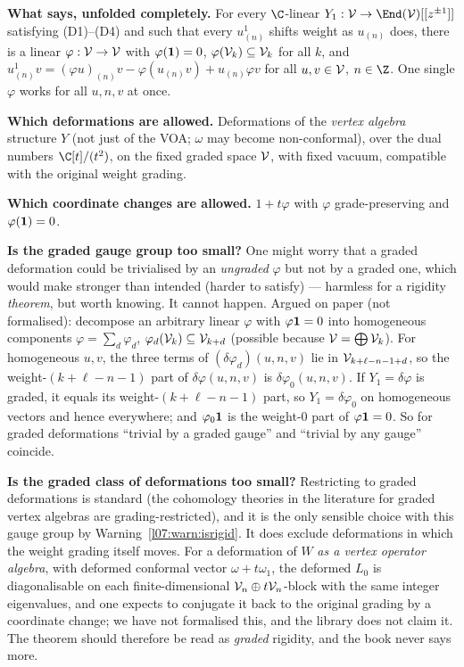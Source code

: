 \begin{dictionary}
\textbf{What  says, unfolded completely.} For every $\C$-linear
$Y_1:\lsevenV\to\End(\lsevenV)[[z^{\pm1}]]$ satisfying (D1)--(D4) and such that every $u^1_{(n)}$ shifts
weight as $u_{(n)}$ does, there is a linear $\varphi:\mathcal{V}\to\mathcal{V}$ with $\varphi(\mathbf{1}) = 0$,
$\varphi(\mathcal{V}_k)\subseteq\mathcal{V}_k$ for all $k$, and
$u^1_{(n)}v = (\varphi u)_{(n)}v - \varphi(u_{(n)}v) + u_{(n)}\varphi v$ for all $u,v\in\mathcal{V}$,
$n\in\Z$. One single $\varphi$ works for all $u,n,v$ at once.

\textbf{Which deformations are allowed.} Deformations of the \emph{vertex algebra} structure $Y$
(not just of the VOA; $\omega$ may become non-conformal), over the dual numbers $\C[t]/(t^2)$, on the
fixed graded space $\mathcal{V}$, with fixed vacuum, compatible with the original weight grading.

\textbf{Which coordinate changes are allowed.} $1+t\varphi$ with $\varphi$ grade-preserving and
$\varphi(\mathbf{1}) = 0$.

\textbf{Is the graded gauge group too small?} One might worry that a graded deformation could be
trivialised by an \emph{ungraded} $\varphi$ but not by a graded one, which would make
 stronger than intended (harder to satisfy) --- harmless for a rigidity
\emph{theorem}, but worth knowing. It cannot happen. Argued on paper (not formalised): decompose an
arbitrary linear $\varphi$ with $\varphi\mathbf{1} = 0$ into homogeneous components
$\varphi = \sum_d\varphi_d$, $\varphi_d(\mathcal{V}_k)\subseteq\mathcal{V}_{k+d}$ (possible because $\mathcal{V} =
\bigoplus\mathcal{V}_k$). For homogeneous $u,v$, the three terms of $(\delta\varphi_d)(u,n,v)$ lie in
$\mathcal{V}_{k+\ell-n-1+d}$, so the weight-$(k+\ell-n-1)$ part of $\delta\varphi(u,n,v)$ is
$\delta\varphi_0(u,n,v)$. If $Y_1 = \delta\varphi$ is graded, it equals its weight-$(k+\ell-n-1)$ part,
so $Y_1 = \delta\varphi_0$ on homogeneous vectors and hence everywhere; and $\varphi_0\mathbf{1}$ is the
weight-$0$ part of $\varphi\mathbf{1} = 0$. So for graded deformations ``trivial by a graded gauge'' and
``trivial by any gauge'' coincide.

\textbf{Is the graded class of deformations too small?} Restricting to graded deformations is
standard (the cohomology theories in the literature for graded vertex algebras are
grading-restricted), and it is the only sensible choice with this gauge group by
Warning~\ref{l07:warn:isrigid}. It does exclude deformations in which the weight grading itself
moves. For a deformation of $W$ \emph{as a vertex operator algebra}, with deformed conformal vector
$\omega+t\omega_1$, the deformed $L_0$ is diagonalisable on each finite-dimensional
$\mathcal{V}_n\oplus t\mathcal{V}_n$-block with the same integer eigenvalues, and one expects to conjugate it back
to the original grading by a coordinate change; we have not formalised this, and the library does
not claim it. The theorem should therefore be read as \emph{graded} rigidity, and the book never
says more.


\end{dictionary}
